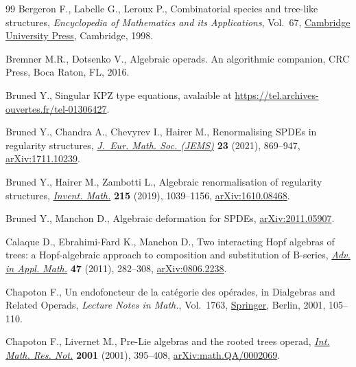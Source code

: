 \documentclass[10pt,a4paper]{amsart}
\numberwithin{equation}{section}
\begin{document}

\begin{thebibliography}{99}
\footnotesize\itemsep=0pt
Bergeron F., Labelle G., Leroux P., Combinatorial species and tree-like
 structures, \textit{Encyclopedia of Mathematics and its Applications},
 Vol.~67, \href{https://doi.org/10.1017/CBO9781107325913}{Cambridge University Press}, Cambridge, 1998.

Bremner M.R., Dotsenko V., Algebraic operads. An algorithmic companion, CRC
 Press, Boca Raton, FL, 2016.

Bruned Y., Singular {KPZ} type equations, avalaible at
 \url{https://tel.archives-ouvertes.fr/tel-01306427}.

Bruned Y., Chandra A., Chevyrev I., Hairer M., Renormalising {SPDE}s in
 regularity structures, \href{https://doi.org/10.4171/jems/1025}{\textit{J.~Eur. Math. Soc. (JEMS)}} \textbf{23} (2021),
 869--947, \href{https://arxiv.org/abs/1711.10239}{arXiv:1711.10239}.

Bruned Y., Hairer M., Zambotti L., Algebraic renormalisation of regularity
 structures, \href{https://doi.org/10.1007/s00222-018-0841-x}{\textit{Invent. Math.}} \textbf{215} (2019), 1039--1156,
 \href{https://arxiv.org/abs/1610.08468}{arXiv:1610.08468}.

Bruned Y., Manchon D., Algebraic deformation for {SPDE}s, \href{https://arxiv.org/abs/2011.05907}{arXiv:2011.05907}.

Calaque D., Ebrahimi-Fard K., Manchon D., Two interacting {H}opf algebras of
 trees: a {H}opf-algebraic approach to composition and substitution of
 {B}-series, \href{https://doi.org/10.1016/j.aam.2009.08.003}{\textit{Adv. in Appl. Math.}} \textbf{47} (2011), 282--308,
 \href{https://arxiv.org/abs/0806.2238}{arXiv:0806.2238}.

Chapoton F., Un endofoncteur de la cat\'egorie des op\'erades, in Dialgebras
 and Related Operads, \textit{Lecture Notes in Math.}, Vol.~1763, \href{https://doi.org/10.1007/3-540-45328-8_4}{Springer},
 Berlin, 2001, 105--110.

Chapoton F., Livernet M., Pre-{L}ie algebras and the rooted trees operad,
 \href{https://doi.org/10.1155/S1073792801000198}{\textit{Int. Math. Res. Not.}} \textbf{2001} (2001), 395--408,
 \href{https://arxiv.org/abs/math.QA/0002069}{arXiv:math.QA/0002069}.


\end{thebibliography}
\end{document}
